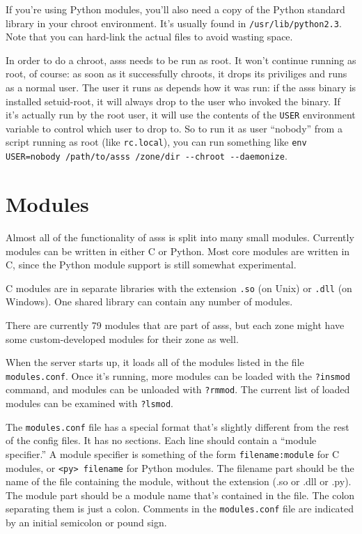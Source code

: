 \documentclass{article}
\newcommand{\asss}{asss}
\begin{document}
If you're using Python modules, you'll also need a copy of the Python
standard library in your chroot environment. It's usually found in
\verb+/usr/lib/python2.3+. Note that you can hard-link the actual files
to avoid wasting space.

In order to do a chroot, \asss{} needs to be run as root. It won't
continue running as root, of course: as soon as it successfully chroots,
it drops its priviliges and runs as a normal user. The user it runs as
depends how it was run: if the \asss{} binary is installed setuid-root,
it will always drop to the user who invoked the binary. If it's actually
run by the root user, it will use the contents of the \verb/USER/
environment variable to control which user to drop to. So to run it as
user ``nobody'' from a script running as root (like \verb/rc.local/),
you can run something like
\verb|env USER=nobody /path/to/asss /zone/dir --chroot --daemonize|.


\section{Modules}

Almost all of the functionality of \asss{} is split into many small
modules. Currently modules can be written in either C or Python. Most
core modules are written in C, since the Python module support is still
somewhat experimental.

C modules are in separate libraries with the extension \verb/.so/ (on
Unix) or \verb/.dll/ (on Windows). One shared library can contain any
number of modules.

There are currently
79
modules that are part of \asss{}, but each zone might have some
custom-developed modules for their zone as well.

When the server starts up, it loads all of the modules listed in the
file \verb/modules.conf/. Once it's running, more modules can be loaded
with the \verb/?insmod/ command, and modules can be unloaded with
\verb/?rmmod/. The current list of loaded modules can be examined with
\verb/?lsmod/.

The \verb/modules.conf/ file has a special format that's slightly
different from the rest of the config files. It has no sections. Each
line should contain a ``module specifier.'' A module specifier is
something of the form \verb/filename:module/ for C modules, or
\verb/<py> filename/ for Python modules. The filename part should be the
name of the file containing the module, without the extension (.so or
.dll or .py). The module part should be a module name that's contained
in the file. The colon separating them is just a colon. Comments in the
\verb/modules.conf/ file are indicated by an initial semicolon or pound
sign.
\end{document}
